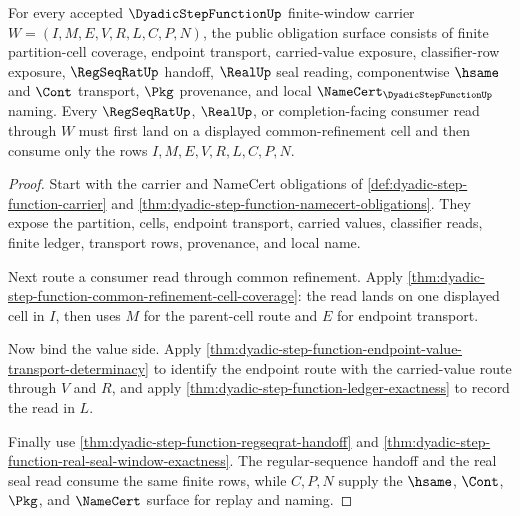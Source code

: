 \begin{theorem}
\label{thm:dyadic-step-function-window-obligations}
For every accepted $\DyadicStepFunctionUp$ finite-window carrier $W=(I,M,E,V,R,L,C,P,N)$, the public obligation surface consists of finite partition-cell coverage, endpoint transport, carried-value exposure, classifier-row exposure, $\RegSeqRatUp$ handoff, $\RealUp$ seal reading, componentwise $\hsame$ and $\Cont$ transport, $\Pkg$ provenance, and local $\NameCert_{\DyadicStepFunctionUp}$ naming. Every $\RegSeqRatUp$, $\RealUp$, or completion-facing consumer read through $W$ must first land on a displayed common-refinement cell and then consume only the rows $I,M,E,V,R,L,C,P,N$.
\end{theorem}
\begin{proof}
Start with the carrier and NameCert obligations of \autoref{def:dyadic-step-function-carrier} and \autoref{thm:dyadic-step-function-namecert-obligations}. They expose the partition, cells, endpoint transport, carried values, classifier reads, finite ledger, transport rows, provenance, and local name.

Next route a consumer read through common refinement. Apply \autoref{thm:dyadic-step-function-common-refinement-cell-coverage}: the read lands on one displayed cell in $I$, then uses $M$ for the parent-cell route and $E$ for endpoint transport.

Now bind the value side. Apply \autoref{thm:dyadic-step-function-endpoint-value-transport-determinacy} to identify the endpoint route with the carried-value route through $V$ and $R$, and apply \autoref{thm:dyadic-step-function-ledger-exactness} to record the read in $L$.

Finally use \autoref{thm:dyadic-step-function-regseqrat-handoff} and \autoref{thm:dyadic-step-function-real-seal-window-exactness}. The regular-sequence handoff and the real seal read consume the same finite rows, while $C,P,N$ supply the $\hsame$, $\Cont$, $\Pkg$, and $\NameCert$ surface for replay and naming.
\end{proof}

